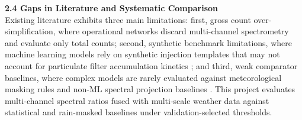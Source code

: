 \documentclass[11pt,a4paper]{article}
\begin{document}
\begin{framed}
\vspace{0.6em}
\noindent\textbf{2.4 Gaps in Literature and Systematic Comparison}\\[0.3em]
Existing literature exhibits three main limitations: first, gross count over-simplification, where operational networks discard multi-channel spectrometry and evaluate only total counts; second, synthetic benchmark limitations, where machine learning models rely on synthetic injection templates that may not account for particulate filter accumulation kinetics ; and third, weak comparator baselines, where complex models are rarely evaluated against meteorological masking rules and non-ML spectral projection baselines . This project evaluates multi-channel spectral ratios fused with multi-scale weather data against statistical and rain-masked baselines under validation-selected thresholds.
\end{framed}

\newpage
\end{document}
